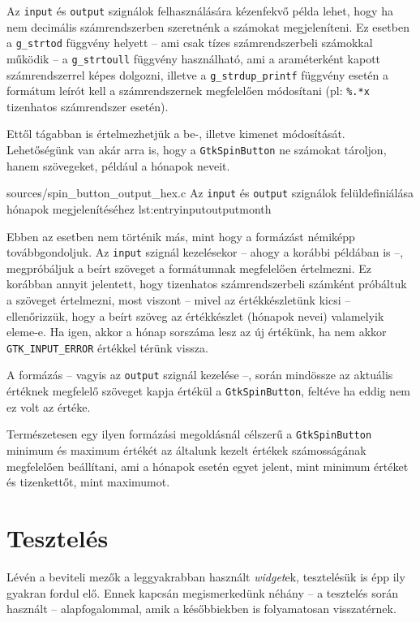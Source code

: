 Az \texttt{input} és \texttt{output} szignálok felhasználására kézenfekvő példa lehet, hogy ha nem decimális számrendszerben szeretnénk a számokat megjeleníteni. Ez esetben a \texttt{g\_strtod} függvény helyett -- ami csak tízes számrendszerbeli számokkal működik -- a \texttt{g\_strtoull} függvény használható, ami a araméterként kapott számrendszerrel képes dolgozni, illetve a \texttt{g\_strdup\_printf} függvény esetén a formátum leírót kell a számrendszernek megfelelően módosítani (pl: \texttt{\%.*x} tizenhatos számrendszer esetén).

Ettől tágabban is értelmezhetjük a be-, illetve kimenet módosítását. Lehetőségünk van akár arra is, hogy a \texttt{GtkSpinButton} ne számokat tároljon, hanem szövegeket, például a hónapok neveit.

{sources/spin_button_output_hex.c}
{Az \texttt{input} és \texttt{output} szignálok felüldefiniálása hónapok megjelenítéséhez}
{lst:entryinputoutputmonth}

Ebben az esetben nem történik más, mint hogy a formázást némiképp továbbgondoljuk. Az \texttt{input} szignál kezelésekor -- ahogy a korábbi példában is --, megpróbáljuk a beírt szöveget a formátumnak megfelelően értelmezni. Ez korábban annyit jelentett, hogy tizenhatos számrendszerbeli számként próbáltuk a szöveget értelmezni, most viszont -- mivel az értékkészletünk kicsi -- ellenőrizzük, hogy a beírt szöveg az értékkészlet (hónapok nevei) valamelyik eleme-e. Ha igen, akkor a hónap sorszáma lesz az új értékünk, ha nem akkor \texttt{GTK\_INPUT\_ERROR} értékkel térünk vissza.

A formázás -- vagyis az \texttt{output} szignál kezelése --, során mindössze az aktuális értéknek megfelelő szöveget kapja értékül a \texttt{GtkSpinButton}, feltéve ha eddig nem ez volt az értéke.

Természetesen egy ilyen formázási megoldásnál célszerű a \texttt{GtkSpinButton} minimum és maximum értékét az általunk kezelt értékek számosságának megfelelően beállítani, ami a hónapok esetén egyet jelent, mint minimum értéket és tizenkettőt, mint maximumot.

\section{Tesztelés}

Lévén a beviteli mezők a leggyakrabban használt \textit{widget}ek, tesztelésük is épp ily gyakran fordul elő. Ennek kapcsán megismerkedünk néhány -- a tesztelés során használt -- alapfogalommal, amik a későbbiekben is folyamatosan visszatérnek.

